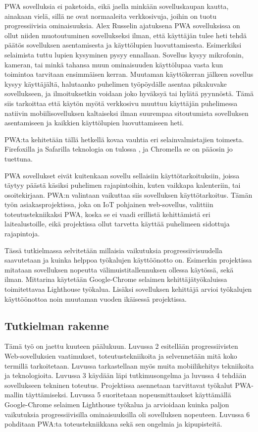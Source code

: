 \documentclass{tktltiki}
\begin{document}
PWA sovelluksia ei paketoida, eikä jaella minkään sovelluskaupan kautta, ainakaan vielä, sillä ne ovat normaaleita verkkosivuja, joihin on tuotu progressiivisia ominaisuuksia. Alex  Russelin ajatuksena \cite{Russell} PWA sovelluksissa on ollut niiden muotoutuminen sovellukseksi ilman, että käyttäjän tulee heti tehdä päätös sovelluksen asentamisesta ja käyttölupien luovuttamisesta. Esimerkiksi selaimista tuttu lupien kysyminen pysyy ennallaan. Sovellus kysyy mikrofonin, kameran, tai minkä tahansa muun ominaisuuden käyttölupaa vasta kun toimintoa tarvitaan ensimmäisen kerran. Muutaman käyttökerran jälkeen sovellus kysyy käyttäjältä, halutaanko puhelimen työpöydälle asentaa pikakuvake sovellukseen, ja ilmoituksetkin voidaan joko hyväksyä tai hylätä pyynnöstä. Tämä siis tarkoittaa että käytön myötä verkkosivu muuttuu käyttäjän puhelimessa natiivin mobiilisovelluksen kaltaiseksi ilman suurempaa sitoutumista sovelluksen asentamiseen ja kaikkien käyttölupien luovuttamiseen heti. 

PWA:ta kehitetään tällä hetkellä kovaa vauhtia eri selainvalmistajien toimesta. Firefoxilla ja Safarilla teknologia on tulossa \cite{Santoni}, ja Chromella se on pääosin jo tuettuna. 

PWA sovellukset eivät kuitenkaan sovellu sellaisiin käyttötarkoituksiin, joissa täytyy päästä käsiksi puhelimen rajapintoihin, kuten vaikkapa kalenteriin, tai osoitekirjaan. PWA:n valintaan vaikuttaa siis sovelluksen käyttötarkoitus. Tämän työn asiakasprojektissa, joka on IoT pohjainen web-sovellus, valittiin toteutustekniikaksi PWA, koska se ei vaadi erillistä kehittämistä eri laitealustoille, eikä projektissa ollut tarvetta käyttää puhelimeen sidottuja rajapintoja.

Tässä tutkielmassa selvitetään millaisia vaikutuksia progressiivisuudella saavutetaan ja kuinka helppoa työkalujen käyttöönotto on. Esimerkin projektissa mitataan sovelluksen nopeutta välimuistitallennuksen ollessa käytössä, sekä ilman. Mittarina käytetään Google-Chrome selaimen kehittäjätyökaluissa toimitettavaa Lighthouse työkalua. Lisäksi sovelluksen kehittäjä arvioi työkalujen käyttöönottoa noin muutaman vuoden ikäisessä projektissa. 

\subsection{Tutkielman rakenne}

Tämä työ on jaettu kuuteen päälukuun. Luvussa 2 esitellään progressiivisten Web-sovelluksien vaatimukset, toteutustekniikoita ja selvennetään mitä koko termillä tarkoitetaan. Luvussa tarkastellaan myös muita mobiilikehitys tekniikoita ja teknologioita. Luvussa 3 käydään läpi tutkimusongelma ja luvussa 4 tehdään sovellukseen tekninen toteutus. Projektissa asennetaan tarvittavat työkalut PWA-mallin täyttämiseksi. Luvussa 5 suoritetaan nopeusmittaukset käyttämällä Google-Chrome selaimen Lighthouse työkalua ja arvioidaan kuinka paljon vaikutuksia progressiivisilla ominaisuuksilla oli sovelluksen nopeuteen. Luvussa 6 pohditaan PWA:ta toteustekniikkana sekä sen ongelmia ja kipupisteitä.
\end{document}
